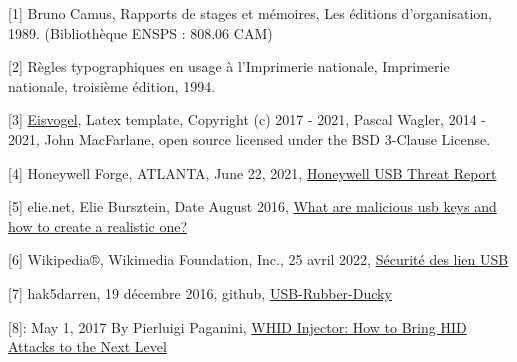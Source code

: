 \documentclass[
  french,
  paper=a4,
  ,captions=tableheading
]{scrartcl}
\begin{document}
{[}1{]} Bruno Camus, Rapports de stages et mémoires, Les éditions
d'organisation, 1989. (Bibliothèque ENSPS : 808.06 CAM)

{[}2{]} Règles typographiques en usage à l'Imprimerie nationale,
Imprimerie nationale, troisième édition, 1994.

{[}3{]}
\href{https://github.com/Wandmalfarbe/pandoc-latex-template}{Eisvogel},
Latex template, Copyright (c) 2017 - 2021, Pascal Wagler, 2014 - 2021,
John MacFarlane, open source licensed under the BSD 3-Clause License.

{[}4{]} Honeywell Forge, ATLANTA, June 22, 2021,
\href{https://www.honeywellforge.ai/us/en/press-release/honeywell-cybersecurity-research-reports-significant-increase-in-usb-threats-that-can-cause-costly-business-disruptions}{Honeywell
USB Threat Report}

{[}5{]} elie.net, Elie Bursztein, Date August 2016,
\href{https://elie.net/blog/security/what-are-malicious-usb-keys-and-how-to-create-a-realistic-one/}{What
are malicious usb keys and how to create a realistic one?}

{[}6{]} Wikipedia®, Wikimedia Foundation, Inc., 25 avril 2022,
\href{https://fr.wikipedia.org/wiki/Sécurité_des_liens_USB}{Sécurité des
lien USB}

{[}7{]} hak5darren, 19 décembre 2016, github,
\href{https://github.com/hak5darren/USB-Rubber-Ducky}{USB-Rubber-Ducky}

{[}8{]}: May 1, 2017 By Pierluigi Paganini,
\href{https://securityaffairs.co/wordpress/58587/hacking/whid-injector-bring-hid-attacks.html\#:~:text=WHID\%20stands\%20for\%20WiFi\%20HID,HID\%20Attacks\%2C\%20during\%20their\%20engagements.}{WHID
Injector: How to Bring HID Attacks to the Next Level}
\end{document}

